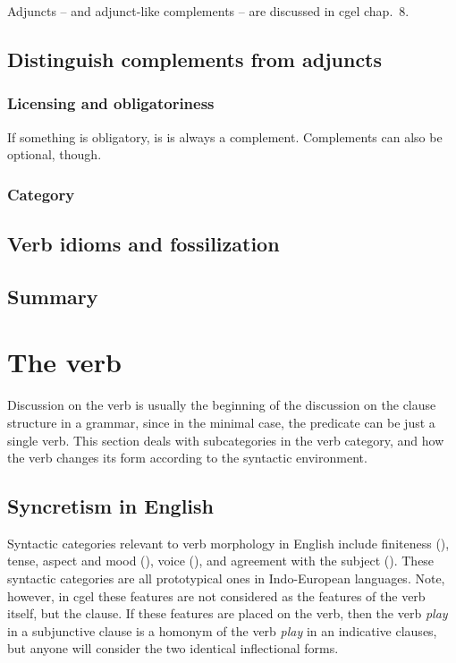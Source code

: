 \documentclass{article}
\newcommand*{\citechap}[1]{chap.~{#1}}
\newcommand*{\corpus}[1]{\emph{#1}}
\begin{document}
Adjuncts -- and adjunct-like complements -- are discussed in \ac{cgel} \citechap{8}.

\subsection{Distinguish complements from adjuncts}\label{sec:recognizing-complement-clause}

\subsubsection{Licensing and obligatoriness}

If something is obligatory, is is always a complement.
Complements can also be optional, though.


\subsubsection{Category}

\subsection{Verb idioms and fossilization}

\subsection{Summary}



\section{The verb}

Discussion on the verb is usually the beginning of the discussion on the clause structure in a grammar,
since in the minimal case, 
the predicate can be just a single verb.
This section deals with subcategories in the verb category,
and how the verb changes its form according to the syntactic environment.

\subsection{Syncretism in English}

Syntactic categories relevant to verb morphology in English include 
finiteness (),
tense, aspect and mood (),
voice (),
and agreement with the subject ().
These syntactic categories are all prototypical ones in Indo-European languages.
Note, however, in \ac{cgel} these features are not considered as the features of the verb itself,
but the clause. 
If these features are placed on the verb, 
then the verb \corpus{play} in a subjunctive clause is a homonym of 
the verb \corpus{play} in an indicative clauses,
but anyone will consider the two identical inflectional forms.
\end{document}
